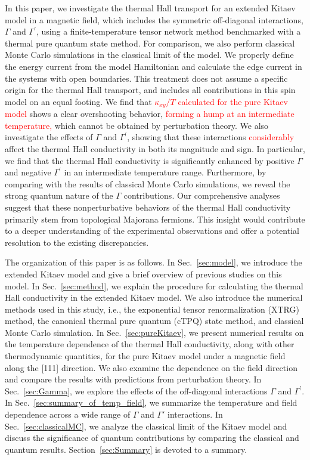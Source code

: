 \documentclass[twocolumn,superscriptaddress,showpacs, longbibliography, aps, prx]{revtex4-2}
\newcommand{\red}[1]{\textcolor{red}{#1}}
\begin{document}
In this paper, we investigate the thermal Hall transport for an extended Kitaev model in a magnetic field, which includes the symmetric off-diagonal interactions, $\Gamma$ and $\Gamma^\prime$, using a finite-temperature tensor network method benchmarked with a thermal pure quantum state method. 
For comparison, we also perform classical Monte Carlo simulations in the classical limit of the model. 
We properly define the energy current from the model Hamiltonian and calculate the edge current in the systems with open boundaries. 
This treatment does not assume a specific origin for the thermal Hall transport, and includes all contributions in this spin model on an equal footing. 
We find that %
\red{$\kappa_{xy}/T$ calculated for the pure Kitaev model} shows a clear overshooting behavior, \red{forming a hump at an intermediate temperature,} which cannot be obtained by perturbation theory. 
We also investigate the effects of $\Gamma$ and $\Gamma^\prime$, showing that these interactions %
\red{considerably} affect the thermal Hall conductivity in both its magnitude and sign.
In particular, we find that the thermal Hall conductivity is significantly enhanced by positive $\Gamma$ and negative $\Gamma^\prime$ in an intermediate temperature range. 
Furthermore, by comparing with the results of classical Monte Carlo simulations, we reveal the strong quantum nature of the $\Gamma$ contributions. 
Our comprehensive analyses suggest that these nonperturbative behaviors of the thermal Hall conductivity primarily stem from topological Majorana fermions. 
This insight would contribute to a deeper understanding of the experimental observations and offer a potential resolution to the existing discrepancies. 

The organization of this paper is as follows. 
In Sec.~\ref{sec:model}, we introduce the extended Kitaev model and give a brief overview of previous studies on this model. 
In Sec.~\ref{sec:method}, we explain the procedure for calculating the thermal Hall conductivity in the extended Kitaev model. 
We also introduce the numerical methods used in this study, i.e., the exponential tensor renormalization (XTRG) method, the canonical thermal pure quantum (cTPQ) state method, and classical Monte Carlo simulation.
In Sec.~\ref{sec:pureKitaev}, we present numerical results on the temperature dependence of the thermal Hall conductivity, along with other thermodynamic quantities, for the pure Kitaev model under a magnetic field along the [111] direction. 
We also examine the dependence on the field direction and compare the results with predictions from perturbation theory. 
In Sec.~\ref{sec:Gamma}, we explore the effects of the off-diagonal interactions $\Gamma$ and $\Gamma^{\prime}$. 
In Sec.~\ref{sec:summary_of_temp_field}, we summarize the temperature and field dependence across a wide range of $\Gamma$ and $\Gamma'$ interactions.
In Sec.~\ref{sec:classicalMC}, we analyze the classical limit of the Kitaev model and discuss the significance of quantum contributions by comparing the classical and quantum results.
Section~\ref{sec:Summary} is devoted to a summary.
\end{document}
